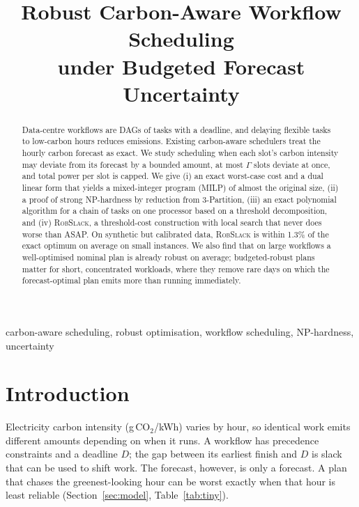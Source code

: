 \documentclass[conference,11pt]{IEEEtran}
\theoremstyle{definition}\newtheorem{remark}{Remark}
\newcommand{\Gm}{\Gamma}
\begin{document}
\title{Robust Carbon-Aware Workflow Scheduling\\ under Budgeted Forecast Uncertainty}
\author{
}
\maketitle

\begin{abstract}
Data-centre workflows are DAGs of tasks with a deadline, and delaying flexible tasks to low-carbon hours reduces emissions. Existing carbon-aware schedulers treat the hourly carbon forecast as exact. We study scheduling when each slot's carbon intensity may deviate from its forecast by a bounded amount, at most $\Gm$ slots deviate at once, and total power per slot is capped. We give (i) an exact worst-case cost and a dual linear form that yields a mixed-integer program (MILP) of almost the original size, (ii) a proof of strong NP-hardness by reduction from 3-Partition, (iii) an exact polynomial algorithm for a chain of tasks on one processor based on a threshold decomposition, and (iv) \textsc{RobSlack}, a threshold-cost construction with local search that never does worse than ASAP. On synthetic but calibrated data, \textsc{RobSlack} is within 1.3\% of the exact optimum on average on small instances. We also find that on large workflows a well-optimised nominal plan is already robust on average; budgeted-robust plans matter for short, concentrated workloads, where they remove rare days on which the forecast-optimal plan emits more than running immediately.
\end{abstract}
\begin{IEEEkeywords}
carbon-aware scheduling, robust optimisation, workflow scheduling, NP-hardness, uncertainty
\end{IEEEkeywords}

\section{Introduction}
Electricity carbon intensity (g\,CO$_2$/kWh) varies by hour, so identical work emits different amounts depending on when it runs. A workflow has precedence constraints and a deadline $D$; the gap between its earliest finish and $D$ is slack that can be used to shift work. The forecast, however, is only a forecast. A plan that chases the greenest-looking hour can be worst exactly when that hour is least reliable (Section~\ref{sec:model}, Table~\ref{tab:tiny}).
\end{document}
